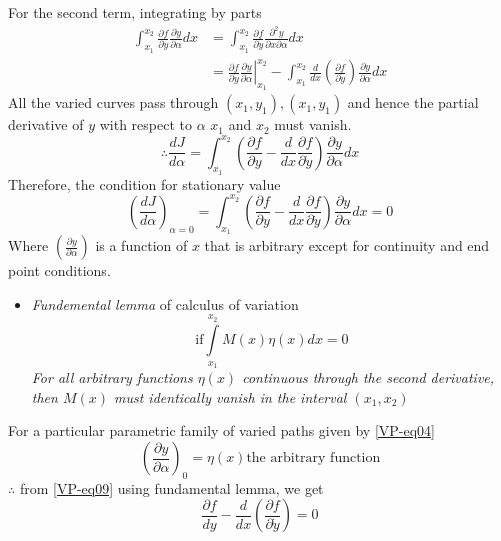 	For the second term, integrating by parts\\
	\begin{align*}
		\int_{x_{1}}^{x_{2}} \frac{\partial f}{\partial \dot{y}} \frac{\partial \dot{y}}{\partial \alpha} d x&=\int_{x_{1}}^{x_{2}} \frac{\partial f}{\partial \dot{y}} \frac{\partial^{2} y}{\partial x \partial \alpha} d x\\
		&=\left.\frac{\partial f}{\partial \dot{y}} \frac{\partial y}{\partial \alpha}\right|_{x_{1}} ^{x_{2}}-\int_{x_{1}}^{x_{2}} \frac{d}{d x}\left(\frac{\partial f}{\partial \dot{y}}\right) \frac{\partial y}{\partial \alpha} d x
	\end{align*}
All the varied curves pass through $(x_1,y_1),(x_1,y_1)$ and hence the partial derivative of $y$ with respect to  $\alpha$ $x_1$ and $x_2$ must vanish.
\begin{equation}
\therefore \frac{d J}{d \alpha}=\int_{x_{1}}^{x_{2}}\left(\frac{\partial f}{\partial y}-\frac{d}{d x} \frac{\partial f}{\partial \dot{y}}\right) \frac{\partial y}{\partial \alpha} d x
\end{equation}
Therefore, the condition for stationary value
\begin{equation}
\left(\frac{dJ}{d\alpha} \right)_{\alpha=0} =\int_{x_{1}}^{x_{2}}\left(\frac{\partial f}{\partial y}-\frac{d}{d x} \frac{\partial f}{\partial \dot{y}}\right) \frac{\partial y}{\partial \alpha} d x=0\label{VP-eq09}
\end{equation}
Where $\left( \frac{\partial y}{\partial \alpha}\right) $ is a function of $x$ that is arbitrary except for continuity and end point conditions.
\begin{itemize}
	\item \textit{Fundemental lemma} of calculus of variation
	\begin{equation}
	\text{if} \int\limits_{x_1}^{x_2}M(x)\eta(x)dx=0
	\end{equation}
	\textit{For all arbitrary functions $\eta (x)$ continuous through the second derivative, then $M(x)$ must identically vanish in the interval $(x_1,x_2)$}
\end{itemize}
	For a particular parametric family of varied paths given by \ref{VP-eq04}
	$$\left(\frac{\partial y}{\partial\alpha} \right)_0 =\eta(x)\text{the arbitrary function}$$
	$\therefore$ from \ref{VP-eq09} using fundamental lemma, we get 
	\begin{equation}
	\frac{\partial f}{dy}-\frac{d}{dx}\left( \frac{\partial f}{\partial\dot{y}}\right) =0\label{VP-11}
	\end{equation}
